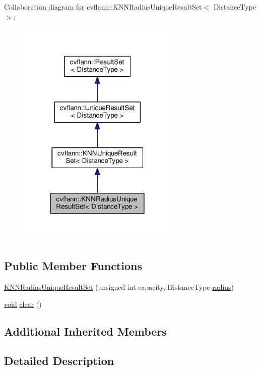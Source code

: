 Collaboration diagram for cvflann\-:\-:K\-N\-N\-Radius\-Unique\-Result\-Set$<$ Distance\-Type $>$\-:\nopagebreak
\begin{figure}[H]
\begin{center}
\leavevmode
\includegraphics[width=218pt]{classcvflann_1_1KNNRadiusUniqueResultSet__coll__graph}
\end{center}
\end{figure}
\subsection*{Public Member Functions}
\begin{DoxyCompactItemize}
\item 
\hyperlink{classcvflann_1_1KNNRadiusUniqueResultSet_a6969afd2ed502f62f1bd85362ed292a8}{K\-N\-N\-Radius\-Unique\-Result\-Set} (unsigned int capacity, Distance\-Type \hyperlink{imgproc__c_8h_a32526d67e420fc7060ade2efeaeda976}{radius})
\item 
\hyperlink{legacy_8hpp_a8bb47f092d473522721002c86c13b94e}{void} \hyperlink{classcvflann_1_1KNNRadiusUniqueResultSet_a27dc9cb92948546e04ecad20682f06c0}{clear} ()
\end{DoxyCompactItemize}
\subsection*{Additional Inherited Members}


\subsection{Detailed Description}
